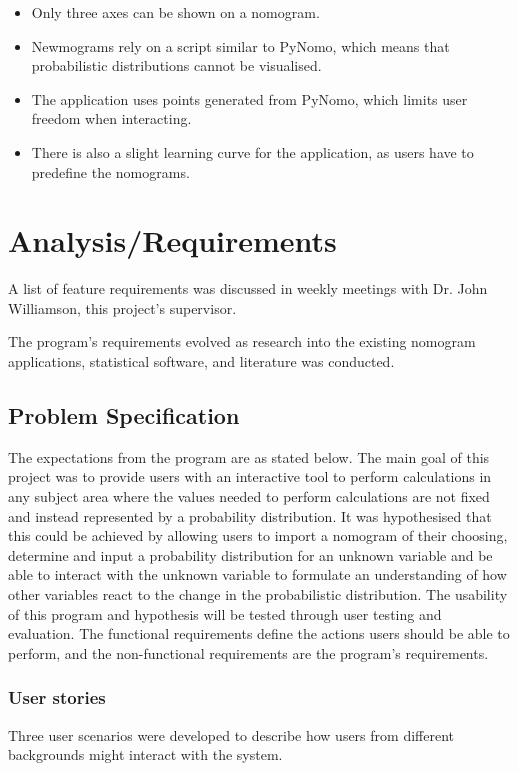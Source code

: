 \documentclass{l4proj}
\begin{document}
\begin{itemize}

    \item Only three axes can be shown on a nomogram.
    \item Newmograms rely on a script similar to PyNomo, which means that probabilistic distributions cannot be visualised.
    \item The application uses points generated from PyNomo, which limits user freedom when interacting. 
    \item There is also a slight learning curve for the application, as users have to predefine the nomograms. 
    
    
\end{itemize}

\chapter{Analysis/Requirements}\label{requirements}
A list of feature requirements was discussed in weekly meetings with Dr. John Williamson, this project's supervisor. 

The program's requirements evolved as research into the existing nomogram applications, statistical software, and literature was conducted. 

\section{Problem Specification}

The expectations from the program are as stated below. 
The main goal of this project was to provide users with an interactive tool to perform calculations in any subject area where the values needed to perform calculations are not fixed and instead represented by a probability distribution. It was hypothesised that this could be achieved by allowing users to import a nomogram of their choosing, determine and input a probability distribution for an unknown variable and be able to interact with the unknown variable to formulate an understanding of how other variables react to the change in the probabilistic distribution. The usability of this program and hypothesis will be tested through user testing and evaluation.
The functional requirements define the actions users should be able to perform, and the non-functional requirements are the program's requirements.  
\subsection{User stories}
Three user scenarios were developed to describe how users from different backgrounds might interact with the system. 
\end{document}
